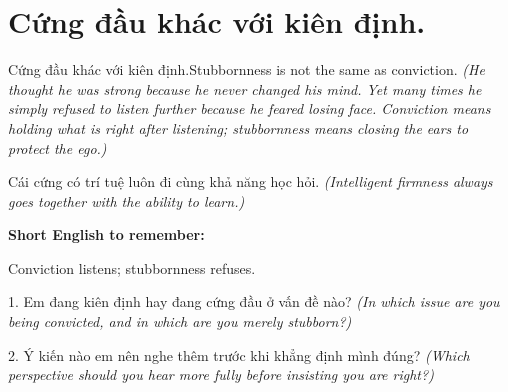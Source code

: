 \section{Cứng đầu khác với kiên định.}
\begin{truyen}{Cứng đầu khác với kiên định.}{Stubbornness is not the same as conviction.}
\textit{(He thought he was strong because he never changed his mind. Yet many times he simply refused to listen further because he feared losing face. Conviction means holding what is right after listening; stubbornness means closing the ears to protect the ego.)}
\end{truyen}
\begin{baihoc}
Cái cứng có trí tuệ luôn đi cùng khả năng học hỏi.
\textit{(Intelligent firmness always goes together with the ability to learn.)}
\end{baihoc}
\begin{ghinhoanh}
\textbf{Short English to remember:}

Conviction listens; stubbornness refuses.
\end{ghinhoanh}
\begin{tuhocnhanh}
1. Em đang kiên định hay đang cứng đầu ở vấn đề nào? \textit{(In which issue are you being convicted, and in which are you merely stubborn?)}

2. Ý kiến nào em nên nghe thêm trước khi khẳng định mình đúng? \textit{(Which perspective should you hear more fully before insisting you are right?)}
\end{tuhocnhanh}
\ngancach

